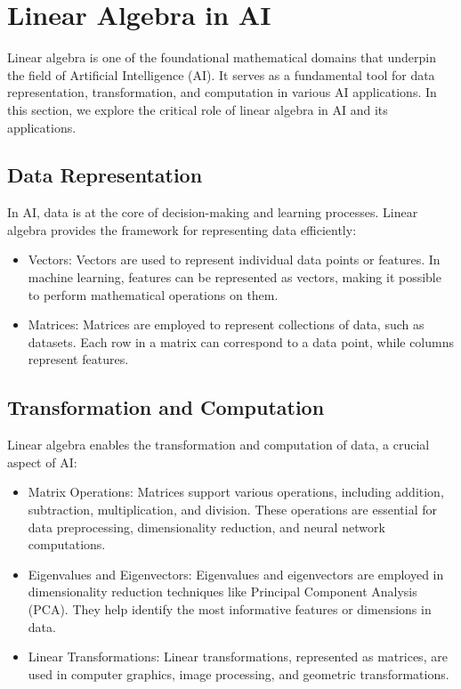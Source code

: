 \documentclass[conference]{IEEEtran}
\begin{document}
\section{Linear Algebra in AI}

Linear algebra is one of the foundational mathematical domains that underpin the field of Artificial Intelligence (AI). It serves as a fundamental tool for data representation, transformation, and computation in various AI applications. In this section, we explore the critical role of linear algebra in AI and its applications.

\subsection{Data Representation}

In AI, data is at the core of decision-making and learning processes. Linear algebra provides the framework for representing data efficiently:
    \begin{itemize}
    \item Vectors: Vectors are used to represent individual data points or features. In machine learning, features can be represented as vectors, making it possible to perform mathematical operations on them.

    \item Matrices: Matrices are employed to represent collections of data, such as datasets. Each row in a matrix can correspond to a data point, while columns represent features.
    \end{itemize}

\subsection{Transformation and Computation}

Linear algebra enables the transformation and computation of data, a crucial aspect of AI:
    \begin{itemize}
      \item Matrix Operations: Matrices support various operations, including addition, subtraction, multiplication, and division. These operations are essential for data preprocessing, dimensionality reduction, and neural network computations.

      \item Eigenvalues and Eigenvectors: Eigenvalues and eigenvectors are employed in dimensionality reduction techniques like Principal Component Analysis (PCA). They help identify the most informative features or dimensions in data.

      \item Linear Transformations: Linear transformations, represented as matrices, are used in computer graphics, image processing, and geometric transformations.
    \end{itemize}
\end{document}
